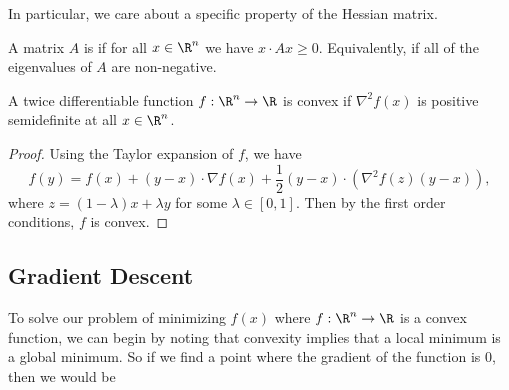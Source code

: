 \documentclass[a4paper]{scrartcl}
\begin{document}
In particular, we care about a specific property of the Hessian matrix.

\begin{definition}
    A matrix $A$ is  if for all $x \in \R^n$ we have $x \cdot Ax \geq 0$. Equivalently, if all of the eigenvalues of $A$ are non-negative.
\end{definition}


\begin{proposition}
A twice differentiable function $f:\R^n \rightarrow \R$ is convex if $\nabla^2 f(x)$ is positive semidefinite at all $x \in \R^n$.
\end{proposition}
\begin{proof}
    Using the Taylor expansion of $f$, we have
    $$
f(y) = f(x) + (y - x) \cdot \nabla f(x) + \frac{1}{2}(y - x) \cdot ( \nabla^2f(z)(y - x)),
    $$
    where $z = (1 - \lambda)x + \lambda y$ for some $\lambda \in [0, 1]$. Then by the first order conditions, $f$ is convex.
\end{proof}

\subsection{Gradient Descent}

To solve our problem of minimizing $f(x)$ where $f : \R^n \rightarrow \R$ is a convex function, we can begin by noting that convexity implies that a local minimum is a global minimum. So if we find a point where the gradient of the function is 0, then we would be 


\end{document}
